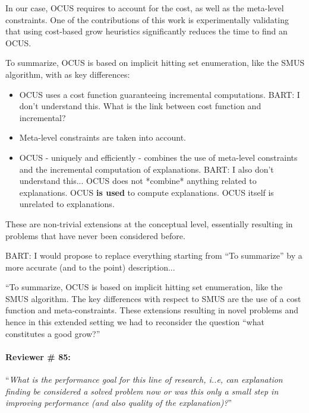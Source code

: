 \documentclass{article}
\begin{document}
In our case, OCUS requires to account for the cost, as well as the meta-level constraints. One of the contributions of this work is experimentally validating that using cost-based grow heuristics significantly reduces the time to find an OCUS.

To summarize, OCUS is based on implicit hitting set enumeration, like the SMUS algorithm, with as key differences: 
\begin{itemize}
	\item OCUS uses a cost function guaranteeing incremental computations. {\color{red}BART: I don't understand this. What is the link between cost function and incremental? } 
	\item Meta-level constraints are taken into account. 
	\item OCUS - uniquely and efficiently - combines the use of meta-level constraints and the incremental computation of explanations.  {\color{red}BART: I also don't understand this... OCUS does not *combine* anything related to explanations. OCUS \textbf{is used} to compute explanations. OCUS itself is unrelated to explanations.}
\end{itemize}

These are non-trivial extensions at the conceptual level, essentially resulting in problems that have never been considered before.


{\color{red}BART:  I would propose to replace everything starting from ``To summarize'' by a more accurate (and to the point) description... 

``To summarize, OCUS is based on implicit hitting set enumeration, like the SMUS algorithm. The key differences with respect to SMUS are the use of a cost function and meta-constraints. These extensions resulting in novel problems and hence in this extended setting we had to reconsider the question ``what constitutes a good grow?''}






\paragraph{Reviewer \# 85:}``\textit{What is the performance goal for this line of research, i..e, can explanation finding be considered a solved problem now or was this only a small step in improving performance (and also quality of the explanation)?}''
\end{document}
